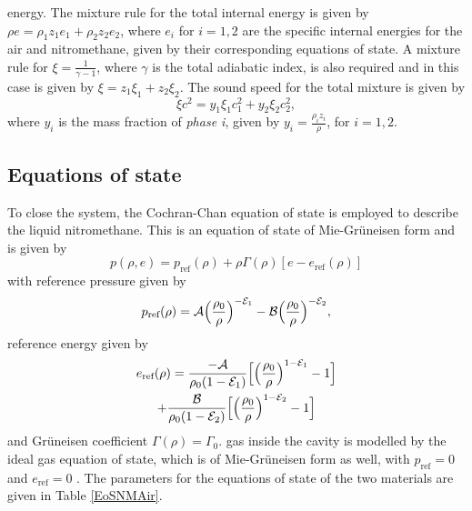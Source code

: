 \documentclass[3p,times,twocolumn]{elsarticle}
\begin{document}
energy.  
 The mixture rule for the total internal energy is given 
by $\rho e=\rho_1z_1e_1+\rho_2z_2e_2$, where $e_i$ for $i=1,2$ are the specific internal energies for the air and nitromethane, 
given by their corresponding equations of state. A mixture rule for $\xi=\frac{1}{\gamma-1}$, where $\gamma$ is the total 
adiabatic index, is also required and in this case is given by $\xi=z_1\xi_1+z_2\xi_2$. 
The sound speed for the total mixture is given by 
\begin{equation}
\xi c^2 = y_1\xi_1c_1^2+y_2\xi_2c_2^2,
\end{equation}
 where $y_i$ is the mass fraction of \emph{phase i}, given by $y_i=\frac{\rho_iz_i}{\rho}$, for $i=1,2$.




\subsection{Equations of state}
\label{Sec:EoS}
To close the system, the Cochran-Chan equation of state \cite{saurel2007relaxation} is employed to describe the liquid nitromethane. 
This is an equation of state of Mie-Gr\"uneisen form and is given by
\begin{equation}
\label{MG}
p(\rho,e)=p_{\text{ref}}(\rho)+\rho\Gamma(\rho)[e-e_{\text{ref}}(\rho)]
\end{equation}
with reference pressure given by 
\begin{equation}
\label{CCeos1}
p_{\text{ref}}(\rho)=\mathcal{A}\Big{(}\frac{\rho_0}{\rho}{\Big{)}^{-\mathcal{E}_1}-\mathcal{B}\Big{(}\frac{\rho_0}{\rho}{\Big{)}^{-\mathcal{E}_2}}},\end{equation}
reference energy given by
\begin{multline}
\label{CCeos2}
e_{\text{ref}}(\rho)=\frac{-\mathcal{A}}{\rho_0(1-\mathcal{E}_1)}\Big{[}\Big{(}\frac{\rho_0}{\rho}\Big{)}^{1-\mathcal{E}_1}-1\Big{]} \\ +\frac{\mathcal{B}}{\rho_0(1-\mathcal{E}_2)}\Big{[}\Big{(}\frac{\rho_0}{\rho}\Big{)}^{1-\mathcal{E}_2}-1\Big{]}
\end{multline}
and Gr\"uneisen coefficient
$\Gamma(\rho)=\Gamma_0.$
 gas inside the cavity is modelled by the ideal gas equation of state, which is of 
Mie-Gr\"uneisen form as well, with $p_{\text{ref}}=0$ and $e_{\text{ref}}=0$ . The parameters for the equations of state of the 
two materials are given in Table \ref{EoSNMAir}.
\end{document}
